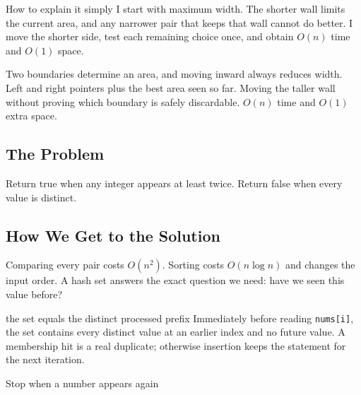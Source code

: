 \begin{revisionbox}{How to explain it simply}
I start with maximum width. The shorter wall limits the current area, and any
narrower pair that keeps that wall cannot do better. I move the
shorter side, test each remaining choice once, and obtain \(O(n)\) time and
\(O(1)\) space.
\end{revisionbox}
\chaptercheckpoint
  {Two boundaries determine an area, and moving inward always reduces width.}
  {Left and right pointers plus the best area seen so far.}
  {Moving the taller wall without proving which boundary is safely discardable.}
  {$O(n)$ time and $O(1)$ extra space.}
\judgeclassnote



\subsection{The Problem}
Return true when any integer appears at least twice. Return false when every
value is distinct.

\subsection{How We Get to the Solution}
Comparing every pair costs \(O(n^2)\). Sorting costs \(O(n\log n)\) and changes
the input order. A hash set answers the exact question we need: have we seen
this value before?

\begin{invariantbox}{the set equals the distinct processed prefix}
Immediately before reading \texttt{nums[i]}, the set contains every distinct
value at an earlier index and no future value. A membership hit is a
real duplicate; otherwise insertion keeps the statement for the next
iteration.
\end{invariantbox}

\begin{visualbox}{Stop when a number appears again}
\centering
{}
\end{visualbox}

